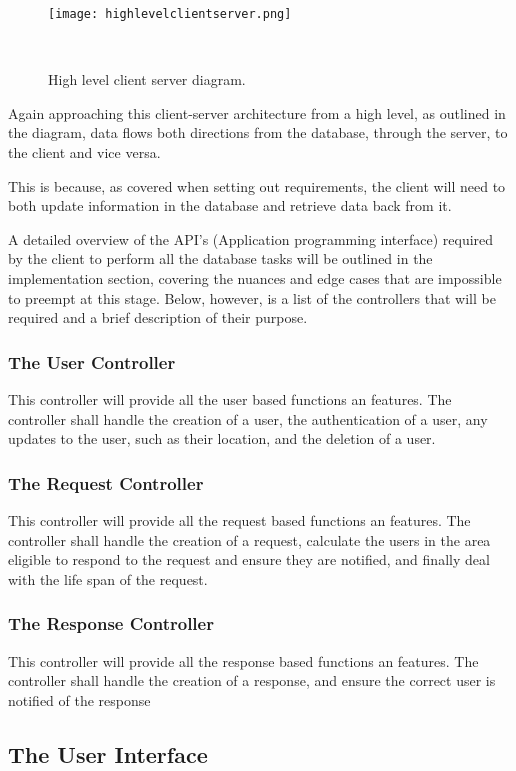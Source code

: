 \documentclass[a4paper]{article}
\begin{document}
\begin{figure}[H]
  \centering
    \texttt{[image: highlevelclientserver.png]} 
     \caption{High level client server diagram.}
     \
     \label{fig:hlcs}
\end{figure}

Again approaching this client-server architecture from a high level, as outlined in the diagram, data flows both directions from the database, through the server, to the client and vice versa.

This is because, as covered when setting out requirements, the client will need to both update information in the database and retrieve data back from it.

A detailed overview of the API's (Application programming interface) required by the client to perform all the database tasks will be outlined in the implementation section, covering the nuances and edge cases that are impossible to preempt at this stage. Below, however, is a list of the controllers that will be required and a brief description of their purpose.

\subsubsection{The User Controller}
This controller will provide all the user based functions an features. The controller shall handle the creation of a user, the authentication of a user, any updates to the user, such as their location, and the deletion of a user.

\subsubsection{The Request Controller}
This controller will provide all the request based functions an features. The controller shall handle the creation of a request, calculate the users in the area eligible to respond to the request and ensure they are notified, and  finally deal with the life span of the request.

\subsubsection{The Response Controller}
This controller will provide all the response based functions an features. The controller shall handle the creation of a response, and ensure the correct user is notified of the response


\subsection{The User Interface}
\end{document}
